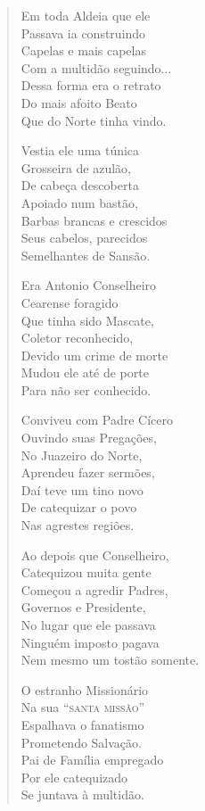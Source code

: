 \begin{verse}
Em toda Aldeia que ele \\
Passava ia construindo \\
Capelas e mais capelas \\
Com a multidão seguindo... \\
Dessa forma era o retrato \\
Do mais afoito Beato \\
Que do Norte tinha vindo. 
\pagebreak

Vestia ele uma túnica \\
Grosseira de azulão, \\
De cabeça descoberta \\
Apoiado num bastão, \\
Barbas brancas e crescidos \\
Seus cabelos, parecidos \\
Semelhantes de Sansão. 

Era Antonio Conselheiro \\
Cearense foragido \\
Que tinha sido Mascate, \\
Coletor reconhecido, \\
Devido um crime de morte \\
Mudou ele até de porte \\
Para não ser conhecido. 

Conviveu com Padre Cícero \\
Ouvindo suas Pregações, \\
No Juazeiro do Norte, \\
Aprendeu fazer sermões, \\
Daí teve um tino novo \\
De catequizar o povo \\
Nas agrestes regiões. 

Ao depois que Conselheiro, \\
Catequizou muita gente \\
Começou a agredir Padres, \\
Governos e Presidente, \\
No lugar que ele passava \\
Ninguém imposto pagava \\
Nem mesmo um tostão somente. 
\pagebreak

O estranho Missionário \\
Na sua ``\textsc{santa missão}'' \\
Espalhava o fanatismo \\
Prometendo Salvação. \\
Pai de Família empregado \\
Por ele catequizado \\
Se juntava à multidão. 


\end{verse}
